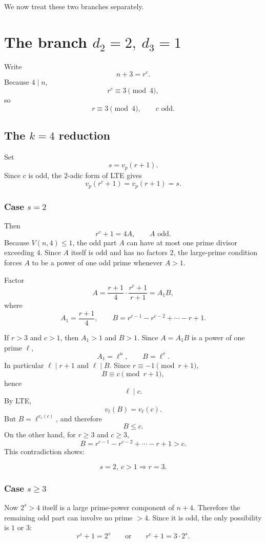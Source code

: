 \documentclass[11pt]{article}
\newcommand{\vp}{v_p}
\begin{document}
We now treat these two branches separately.

\section{The branch \(d_2=2,\ d_3=1\)}

Write
\[
n+3=r^c.
\]
Because \(4\mid n\),
\[
r^c\equiv3\pmod4,
\]
so
\[
\boxed{
r\equiv3\pmod4,
\qquad
c\text{ odd}.
}
\tag{13}
\]

\subsection{The \(k=4\) reduction}

Set
\[
s=\vp(r+1).
\]
Since \(c\) is odd, the \(2\)-adic form of LTE gives
\[
\vp(r^c+1)=\vp(r+1)=s.
\tag{14}
\]

\subsubsection{Case \(s=2\)}

Then
\[
r^c+1=4A,
\qquad
A\text{ odd}.
\]
Because \(V(n,4)\leq1\), the odd part \(A\) can have at most one prime divisor
exceeding \(4\).  Since \(A\) itself is odd and has no factors \(2\), the
large-prime condition forces \(A\) to be a power of one odd prime whenever
\(A>1\).

Factor
\[
A=
\frac{r+1}{4}
\cdot
\frac{r^c+1}{r+1}
=
A_1B,
\]
where
\[
A_1=\frac{r+1}{4},
\qquad
B=r^{c-1}-r^{c-2}+\cdots-r+1.
\]

If \(r>3\) and \(c>1\), then \(A_1>1\) and \(B>1\).  Since
\(A=A_1B\) is a power of one prime \(\ell\),
\[
A_1=\ell^u,\qquad B=\ell^v.
\]
In particular \(\ell\mid r+1\) and \(\ell\mid B\).  Since
\(r\equiv-1\pmod{r+1}\),
\[
B\equiv c\pmod{r+1},
\]
hence
\[
\ell\mid c.
\]
By LTE,
\[
v_\ell(B)=v_\ell(c).
\]
But \(B=\ell^{v_\ell(c)}\), and therefore
\[
B\leq c.
\]
On the other hand, for \(r\geq3\) and \(c\geq3\),
\[
B=r^{c-1}-r^{c-2}+\cdots-r+1>c.
\]
This contradiction shows:

\[
\boxed{
s=2,\ c>1
\Longrightarrow
r=3.
}
\tag{15}\label{eq:r3reduction}
\]

\subsubsection{Case \(s\geq3\)}

Now \(2^s>4\) itself is a large prime-power component of \(n+4\).  Therefore
the remaining odd part can involve no prime \(>4\).  Since it is odd, the
only possibility is \(1\) or \(3\):
\[
r^c+1=2^s
\qquad\text{or}\qquad
r^c+1=3\cdot2^s.
\]
\end{document}
